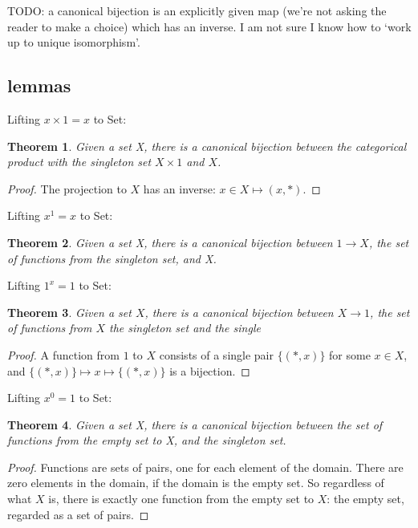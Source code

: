 \documentclass{proc-l}
\newtheorem{theorem}{Theorem}[section]
\theoremstyle{definition}
\theoremstyle{remark}
\numberwithin{equation}{section}
\begin{document}
TODO: a canonical bijection is an explicitly given map (we're not asking the reader to make a choice) which has an inverse.
I am not sure I know how to `work up to unique isomorphism'.

\subsection{lemmas}

Lifting \(x \times 1 = x\) to Set:

\begin{theorem}
Given a set X, there is a canonical bijection between the categorical product with the singleton set \(X \times 1\) and \(X\).
\end{theorem}

\begin{proof}
The projection to \(X\) has an inverse: \(x \in X \mapsto (x, *)\). 
\end{proof}

Lifting \(x^1 = x\) to Set:

\begin{theorem}
Given a set X, there is a canonical bijection between \(1 \to X\), the set of functions from the singleton set, and X.
\end{theorem}

Lifting \(1^x = 1\) to Set:

\begin{theorem}
Given a set \(X\), there is a canonical bijection between \(X \to 1\), the set of functions from \(X\) the singleton set
and the single

\end{theorem}

\begin{proof}
A function from \(1\) to \(X\) consists of a single pair \(\{(*, x)\}\) for some \(x \in X\), and \(\{(*, x)\} \mapsto x \mapsto \{(*, x)\}\) is a bijection.
\end{proof}

Lifting \(x^0 = 1\) to Set:

\begin{theorem}
Given a set X, there is a canonical bijection between the set of functions from the empty set to X, and the singleton set.
\end{theorem}

\begin{proof}
Functions are sets of pairs, one for each element of the domain. There are zero elements in the domain, if the domain is the empty set. So regardless of what \(X\) is, there is exactly one function from the empty set to \(X\): the empty set, regarded as a set of pairs.
\end{proof}
\end{document}
